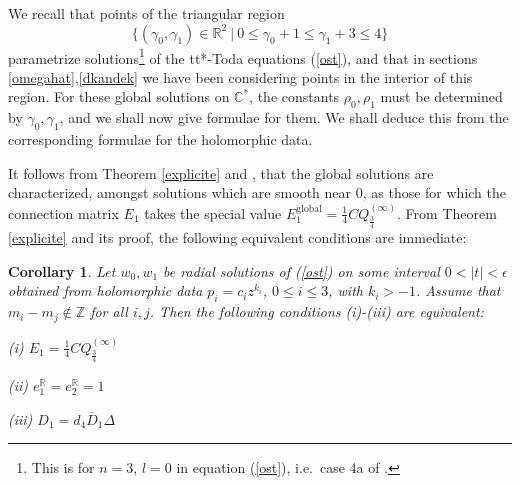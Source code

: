 \documentclass[a4paper,12pt,leqno]{amsart}
\numberwithin{equation}{section}
\theoremstyle{plain}
\newtheorem{corollary}[theorem]{Corollary}
\theoremstyle{definition}
\newcommand{\C}{\mathbb C}
\newcommand{\R}{\mathbb R}
\newcommand{\Z}{\mathbb Z}
\newcommand{\ga}{\gamma}
\newcommand{\eps}{\epsilon}
\newcommand{\De}{\Delta}
\newcommand{\no}{\noindent}
\newcommand{\st}{\ \vert\ }
\newcommand{\Qi}{  Q^{(\infty)}  }
\newcommand{\nn}{m}
\begin{document}
We recall that points of the triangular region 
\[
\{(\ga_0,\ga_1)\in\R^2 \st 0\le \ga_0+1\le  \ga_1+3\le 4 \}
\]
parametrize solutions\footnote{This is for $n=3$, $l=0$
in equation (\ref{ost}), i.e.\ case 4a of \cite{GuItLiXX}.} 
of the tt*-Toda equations (\ref{ost}), and that in sections \ref{omegahat},\ref{dkandek} we have been considering points in the interior of this region.
For these global solutions on $\C^\ast$, the constants $\rho_0,\rho_1$ must be determined by $\ga_0,\ga_1$, and we shall now give formulae for them.  We shall deduce this from the corresponding formulae for the holomorphic data.

It follows from Theorem \ref{explicite} and  \cite{GuItLiXX}, \cite{GuItLi15}  that the global solutions are characterized, amongst solutions which are smooth near $0$, as those for which the connection matrix $E_1$ takes the special value $E_1^{\text{global}} = \tfrac14C \Qi_{\frac34}$.  From Theorem \ref{explicite} and its proof, the following equivalent conditions are immediate:
  
\begin{corollary}\label{speciale} Let $w_0,w_1$ be radial solutions of (\ref{ost}) on some interval $0<\vert t\vert < \eps$ obtained from holomorphic data $p_i=c_i z^{k_i}$, $0\le i\le 3$, with
$k_i>-1$.  Assume that
$\nn_i-\nn_j\notin\Z$ for all $i,j$. 
Then the following conditions (i)-(iii) are equivalent:

\no (i) $E_1 = \tfrac14C \Qi_{\frac34}$

\no (ii) $e^\R_1=e^\R_2=1$

\no (iii) $D_1=d_4 \bar D_1 \De$
\end{corollary} 
\end{document}

